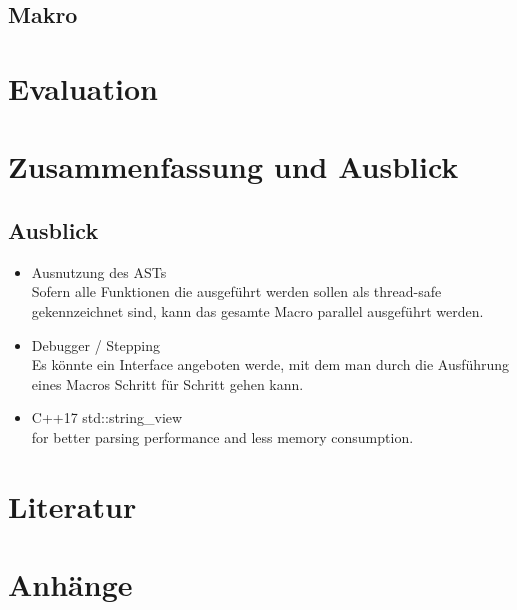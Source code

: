   \subsection{Makro}
  \label{ssec:Makro}

\section{Evaluation}
\label{sec:Evaluation}
\section{Zusammenfassung und Ausblick}
\label{sec:Zusammenfassung und Ausblick}

  \subsection{Ausblick}
  \label{sec:Ausblick}
    \begin{itemize}
      \item Ausnutzung des ASTs\\
        Sofern alle Funktionen die ausgeführt werden sollen als thread-safe gekennzeichnet sind, kann das gesamte Macro parallel ausgeführt werden.
      \item Debugger / Stepping\\
        Es könnte ein Interface angeboten werde, mit dem man durch die Ausführung eines Macros Schritt für Schritt gehen kann.
      \item C++17 std::string\_view\\
        for better parsing performance and less memory consumption.
    \end{itemize}


\section{Literatur}
\label{sec:Literatur}
  \nocite{*} %
  \printbibliography[heading=none]

\section{Anhänge}
\label{sec:Anhänge}


